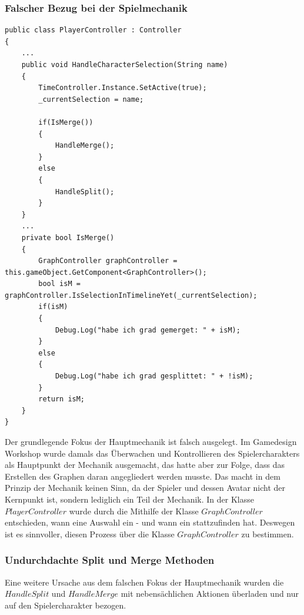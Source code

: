 \subsubsection{Falscher Bezug bei der Spielmechanik}
\begin{lstlisting}[caption={HandleCharacterSelection in der PlayerController.cs}, label={sec:playercontroller_old}]
public class PlayerController : Controller
{
    ...
    public void HandleCharacterSelection(String name)
    {
        TimeController.Instance.SetActive(true);
        _currentSelection = name;
        
        if(IsMerge())
        {
            HandleMerge();
        }
        else
        {
            HandleSplit();
        }
    }
    ...
    private bool IsMerge()
    {
        GraphController graphController = this.gameObject.GetComponent<GraphController>();
        bool isM = graphController.IsSelectionInTimelineYet(_currentSelection);
        if(isM)
        {   
            Debug.Log("habe ich grad gemerget: " + isM);
        }
        else
        {
            Debug.Log("habe ich grad gesplittet: " + !isM);
        }
        return isM;
    }
}
\end{lstlisting}
Der grundlegende Fokus der Hauptmechanik ist falsch ausgelegt. Im Gamedesign Workshop wurde damals das Überwachen und Kontrollieren des Spielercharakters als Hauptpunkt der Mechanik ausgemacht, das hatte aber zur Folge, dass das Erstellen des Graphen daran angegliedert werden musste. Das macht in dem Prinzip der Mechanik keinen Sinn, da der Spieler und dessen Avatar nicht der Kernpunkt ist, sondern lediglich ein Teil der Mechanik. In der Klasse $PlayerController$ wurde durch die Mithilfe der Klasse $GraphController$ entschieden, wann eine Auswahl ein - und wann ein  stattzufinden hat. Deswegen ist es sinnvoller, diesen Prozess über die Klasse $GraphController$ zu bestimmen.
\newpage
\subsubsection{Undurchdachte Split und Merge Methoden}\label{sec:bad_merge_split}
Eine weitere Ursache aus dem falschen Fokus der Hauptmechanik wurden die\\ $HandleSplit$ und $HandleMerge$ mit nebensächlichen Aktionen überladen und nur auf den Spielercharakter bezogen.

